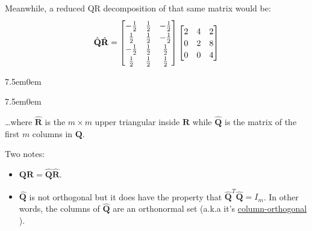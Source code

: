 \documentclass{book}
\newcommand{\hFour}{%
   \color{Cerulean}
   \fontsize{12}{14}\selectfont%
}
\newenvironment{myTindent}{%
   \begin{adjustwidth}{7.5em}{0em}%
}{%
   \end{adjustwidth}%
}
\newcommand{\udefine}[1]{%
   {\setulcolor{Red}%
   \setul{0.14em}{0.07em}%
   \ul{#1}}%
}
\newcommand{\retTwo}{\hfill\bigbreak}
\newcommand{\myMathVS}{\vphantom{\int_a^b}}
\newcommand{\mMat}[1]{\mathbf{#1}}
\begin{document}
   Meanwhile, a reduced QR decomposition of that same matrix would be:
   \[\hat{\mMat{Q}}\hat{\mMat{R}} = \begin{bmatrix}
      -\frac{1}{2} & \frac{1}{2} & -\frac{1}{2}\myMathVS \\
      \frac{1}{2} & \frac{1}{2} & -\frac{1}{2}\myMathVS \\
      -\frac{1}{2} & \frac{1}{2} & \frac{1}{2}\myMathVS \\
      \frac{1}{2} & \frac{1}{2} & \frac{1}{2}\myMathVS \\
   \end{bmatrix}\begin{bmatrix}
      2 & 4 & 2\myMathVS \\ 0 & 2 & 8\myMathVS \\ 0 & 0 & 4\myMathVS
   \end{bmatrix} \]
   
   {\begin{myTindent}\begin{myTindent} \hFour
      \dots where $\hat{\mMat{R}}$ is the $m \times m$ upper triangular inside $\mMat{R}$ while $\hat{\mMat{Q}}$ is the matrix of the first $m$ columns in $\mMat{Q}$. \retTwo
   \end{myTindent}\end{myTindent}}

   Two notes:
   \begin{itemize}
      \item $\mMat{Q}\mMat{R} = \hat{\mMat{Q}}\hat{\mMat{R}}$.
      \item $\hat{\mMat{Q}}$ is not orthogonal but it does have the property that $\hat{\mMat{Q}}^T\hat{\mMat{Q}} = I_m$. In other words, the columns of $\hat{\mMat{Q}}$ are an orthonormal set (a.k.a it's \udefine{column-orthogonal}). \retTwo
   \end{itemize}
   
\end{document}
